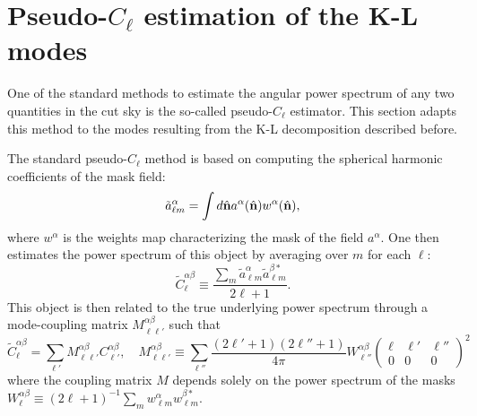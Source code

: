 \documentclass[a4paper,10pt]{article}
\newcommand{\nv}{\hat{\bf n}}
\begin{document}
\section{Pseudo-$C_\ell$ estimation of the K-L modes}
  One of the standard methods to estimate the angular power spectrum of any two quantities in the cut sky is the so-called pseudo-$C_\ell$ estimator. This section adapts this method to the modes resulting from the K-L decomposition described before.
  
  The standard pseudo-$C_\ell$ method is based on computing the spherical harmonic coefficients of the mask field:
  \begin{equation}
    \tilde{a}^\alpha_{\ell m}=\int d\nv a^\alpha(\nv)w^\alpha(\nv),
  \end{equation}
  where $w^\alpha$ is the weights map characterizing the mask of the field $a^\alpha$. One then estimates the power spectrum of this object by averaging over $m$ for each $\ell$:
  \begin{equation}
    \tilde{C}^{\alpha\beta}_\ell\equiv\frac{\sum_m\tilde{a}^\alpha_{\ell m}\tilde{a}^{\beta *}_{\ell m}}{2\ell+1}.
  \end{equation}
  This object is then related to the true underlying power spectrum through a mode-coupling matrix $M^{\alpha\beta}_{\ell\ell'}$ such that
  \begin{equation}
    \tilde{C}^{\alpha\beta}_\ell=\sum_{\ell'}M^{\alpha\beta}_{\ell\ell'}C^{\alpha\beta}_{\ell'},\hspace{12pt}
    M^{\alpha\beta}_{\ell \ell'}\equiv\sum_{\ell''}\frac{(2\ell'+1)(2\ell''+1)}{4\pi}W^{\alpha\beta}_{\ell''}
    \left(
    \begin{array}{ccc}
      \ell & \ell' & \ell''\\
      0 & 0 & 0
    \end{array}
    \right)^2
  \end{equation}
  where the coupling matrix $M$ depends solely on the power spectrum of the masks $W^{\alpha\beta}_\ell\equiv(2\ell+1)^{-1}\sum_mw^\alpha_{\ell m}w^{\beta *}_{\ell m}$.
  
\end{document}

